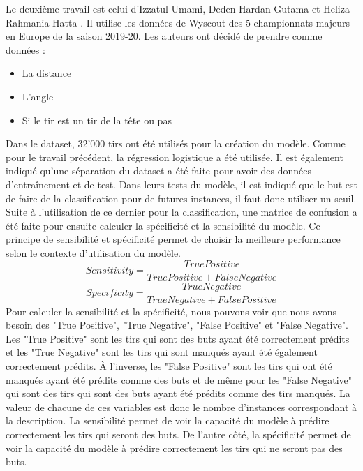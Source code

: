 \documentclass[12pt]{article}
\begin{document}
Le deuxième travail est celui d'Izzatul Umami, Deden Hardan Gutama et Heliza Rahmania Hatta \cite{umamiImplementingExpectedGoal2021}. 
Il utilise les données de Wyscout des 5 championnats majeurs en Europe de la saison 2019-20. 
Les auteurs ont décidé de prendre comme données :
\begin{itemize}
    \item La distance
    \item L'angle
    \item Si le tir est un tir de la tête ou pas
\end{itemize}
Dans le dataset, 32'000 tirs ont été utilisés pour la création du modèle.
Comme pour le travail précédent, la régression logistique a été utilisée.
Il est également indiqué qu'une séparation du dataset a été faite pour avoir des données d'entraînement et de test.
Dans leurs tests du modèle, il est indiqué que le but est de faire de la classification pour de futures instances, il faut donc utiliser un seuil.
Suite à l'utilisation de ce dernier pour la classification, une matrice de confusion a été faite pour ensuite calculer la spécificité et la sensibilité du modèle.
Ce principe de sensibilité et spécificité permet de choisir la meilleure performance selon le contexte d'utilisation du modèle.
\begin{equation}
    Sensitivity = \frac{True Positive}{True Positive + False Negative}
\end{equation}
\begin{equation}
    Specificity = \frac{True Negative}{True Negative + False Positive}
\end{equation}
Pour calculer la sensibilité et la spécificité, nous pouvons voir que nous avons besoin des "True Positive", "True Negative", "False Positive" et "False Negative".
Les "True Positive" sont les tirs qui sont des buts ayant été correctement prédits et les "True Negative" sont les tirs qui sont manqués ayant été également correctement prédits.
À l'inverse, les "False Positive" sont les tirs qui ont été manqués ayant été prédits comme des buts et de même pour les "False Negative" qui sont des tirs qui sont des buts ayant été prédits comme des tirs manqués.
La valeur de chacune de ces variables est donc le nombre d'instances correspondant à la description.
\newline \newline
La sensibilité permet de voir la capacité du modèle à prédire correctement les tirs qui seront des buts.
De l'autre côté, la spécificité permet de voir la capacité du modèle à prédire correctement les tirs qui ne seront pas des buts.
\end{document}
